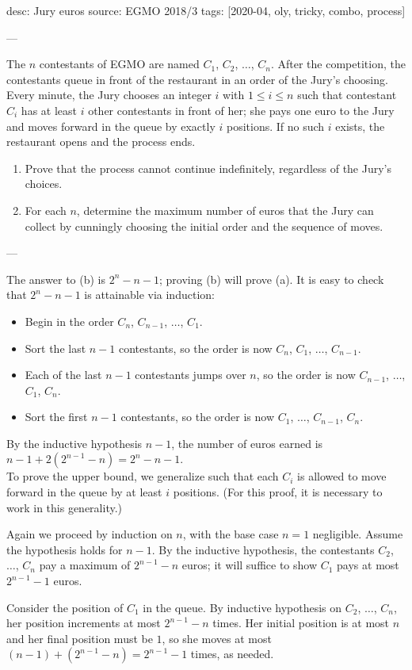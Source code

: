 desc: Jury euros
source: EGMO 2018/3
tags: [2020-04, oly, tricky, combo, process]

---

The $n$ contestants of EGMO are named $C_1$, $C_2$, $\ldots$, $C_n$. After the competition, the contestants queue in front of the restaurant in an order of the Jury's choosing. Every minute, the Jury chooses an integer $i$ with $1\le i\le n$ such that contestant $C_i$ has at least $i$ other contestants in front of her; she pays one euro to the Jury and moves forward in the queue by exactly $i$ positions. If no such $i$ exists, the restaurant opens and the process ends.
\begin{enumerate}[label=(\alph*)]
    \item Prove that the process cannot continue indefinitely, regardless of the Jury’s choices.
    \item For each $n$, determine the maximum number of euros that the Jury can collect by cunningly choosing the initial order and the sequence of moves.
\end{enumerate}

---

The answer to (b) is $2^n-n-1$; proving (b) will prove (a). It is easy to check that $2^n-n-1$ is attainable via induction:
\begin{itemize}[itemsep=0em]
    \item Begin in the order $C_n$, $C_{n-1}$, $\ldots$, $C_1$.
    \item Sort the last $n-1$ contestants, so the order is now $C_n$, $C_1$, $\ldots$, $C_{n-1}$.
    \item Each of the last $n-1$ contestants jumps over $n$, so the order is now $C_{n-1}$, $\ldots$, $C_1$, $C_n$.
    \item Sort the first $n-1$ contestants, so the order is now $C_1$, $\ldots$, $C_{n-1}$, $C_n$.
\end{itemize}
By the inductive hypothesis $n-1$, the number of euros earned is $n-1+2(2^{n-1}-n)=2^n-n-1$.\\

To prove the upper bound, we generalize such that each $C_i$ is allowed to move forward in the queue by at least $i$ positions. (For this proof, it is necessary to work in this generality.)

Again we proceed by induction on $n$, with the base case $n=1$ negligible. Assume the hypothesis holds for $n-1$. By the inductive hypothesis, the contestants $C_2$, $\ldots$, $C_n$ pay a maximum of $2^{n-1}-n$ euros; it will suffice to show $C_1$ pays at most $2^{n-1}-1$ euros.

Consider the position of $C_1$ in the queue. By inductive hypothesis on $C_2$, $\ldots$, $C_n$, her position increments at most $2^{n-1}-n$ times. Her initial position is at most $n$ and her final position must be $1$, so she moves at most $(n-1)+(2^{n-1}-n)=2^{n-1}-1$ times, as needed.
